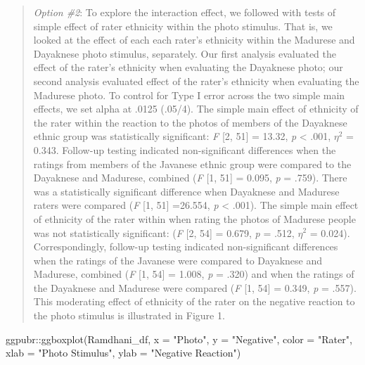 \documentclass[
  11pt,
]{book}
\newenvironment{Shaded}{\begin{snugshade}}{\end{snugshade}}
\newcommand{\AttributeTok}[1]{\textcolor[rgb]{0.77,0.63,0.00}{#1}}
\newcommand{\FunctionTok}[1]{\textcolor[rgb]{0.00,0.00,0.00}{#1}}
\newcommand{\NormalTok}[1]{#1}
\newcommand{\SpecialCharTok}[1]{\textcolor[rgb]{0.00,0.00,0.00}{#1}}
\newcommand{\StringTok}[1]{\textcolor[rgb]{0.31,0.60,0.02}{#1}}
\begin{document}
\begin{quote}
\emph{Option \#2}: To explore the interaction effect, we followed with tests of simple effect of rater ethnicity within the photo stimulus. That is, we looked at the effect of each each rater's ethnicity within the Madurese and Dayaknese photo stimulus, separately. Our first analysis evaluated the effect of the rater's ethnicity when evaluating the Dayaknese photo; our second analysis evaluated effect of the rater's ethnicity when evaluating the Madurese photo. To control for Type I error across the two simple main effects, we set alpha at .0125 (.05/4). The simple main effect of ethnicity of the rater within the reaction to the photos of members of the Dayaknese ethnic group was statistically significant: \emph{F} {[}2, 51{]} = 13.32, \emph{p} \textless{} .001, \(\eta ^{2}\) = 0.343. Follow-up testing indicated non-significant differences when the ratings from members of the Javanese ethnic group were compared to the Dayaknese and Madurese, combined (\emph{F} {[}1, 51{]} = 0.095, \emph{p} = .759). There was a statistically significant difference when Dayaknese and Madurese raters were compared (\emph{F} {[}1, 51{]} =26.554, \emph{p} \textless{} .001). The simple main effect of ethnicity of the rater within when rating the photos of Madurese people was not statistically significant: (\emph{F} {[}2, 54{]} = 0.679, \emph{p} = .512, \(\eta ^{2}\) = 0.024). Correspondingly, follow-up testing indicated non-significant differences when the ratings of the Javanese were compared to Dayaknese and Madurese, combined (\emph{F} {[}1, 54{]} = 1.008, \emph{p} = .320) and when the ratings of the Dayaknese and Madurese were compared (\emph{F} {[}1, 54{]} = 0.349, \emph{p} = .557). This moderating effect of ethnicity of the rater on the negative reaction to the photo stimulus is illustrated in Figure 1.
\end{quote}

\begin{Shaded}
\begin{Highlighting}[]
\NormalTok{ggpubr}\SpecialCharTok{::}\FunctionTok{ggboxplot}\NormalTok{(Ramdhani\_df, }\AttributeTok{x =} \StringTok{"Photo"}\NormalTok{, }\AttributeTok{y =} \StringTok{"Negative"}\NormalTok{, }\AttributeTok{color =} \StringTok{"Rater"}\NormalTok{,}
    \AttributeTok{xlab =} \StringTok{"Photo Stimulus"}\NormalTok{, }\AttributeTok{ylab =} \StringTok{"Negative Reaction"}\NormalTok{)}
\end{Highlighting}
\end{Shaded}
\end{document}
